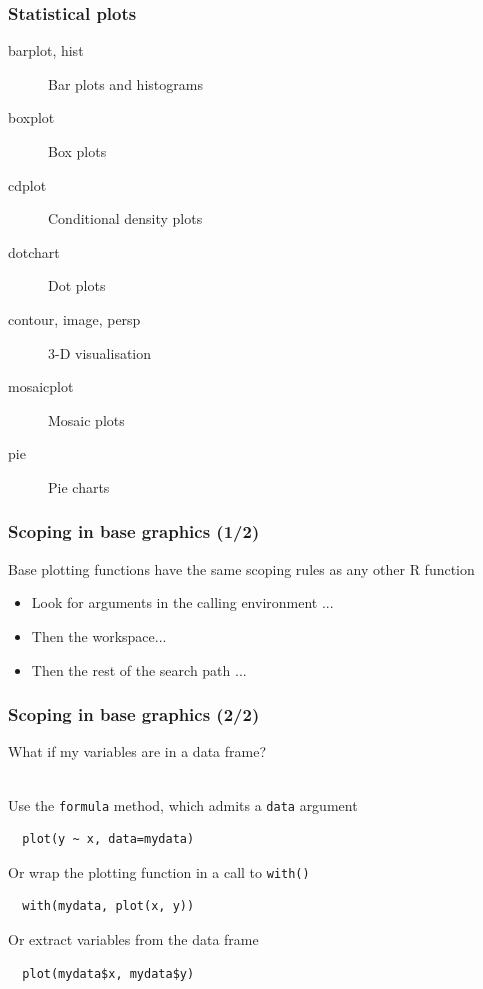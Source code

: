 \documentclass[xcolor=svgnames]{beamer}
\newcommand{\code}[1]{\texttt{#1}}
\begin{document}
\begin{frame}
  \frametitle{Statistical plots}

  \begin{description}
  \item[barplot, hist] Bar plots and histograms
  \item[boxplot] Box plots
  \item[cdplot] Conditional density plots
  \item[dotchart] Dot plots
  \item[contour, image, persp] 3-D visualisation
  \item[mosaicplot] Mosaic plots
  \item[pie] Pie charts
  \end{description}

\end{frame}

\begin{frame}
  \frametitle{Scoping in base graphics (1/2)}

  Base plotting functions have the same scoping rules as any other R
  function
  \begin{itemize}
  \item Look for arguments in the calling environment ...
  \item Then the workspace...
  \item Then the rest of the search path ...
  \end{itemize}

\end{frame}

\begin{frame}[fragile]
  \frametitle{Scoping in base graphics (2/2)}

  What if my variables are in a data frame?

  ~\\
  
  Use the \code{formula} method, which admits a \texttt{data} argument
  \begin{verbatim}
  plot(y ~ x, data=mydata)
  \end{verbatim}
  Or wrap the plotting function in a call to \texttt{with()}
  \begin{verbatim}
  with(mydata, plot(x, y))
  \end{verbatim}
  Or extract variables from the data frame
  \begin{verbatim}
  plot(mydata$x, mydata$y)
  \end{verbatim}

\end{frame}
\end{document}

